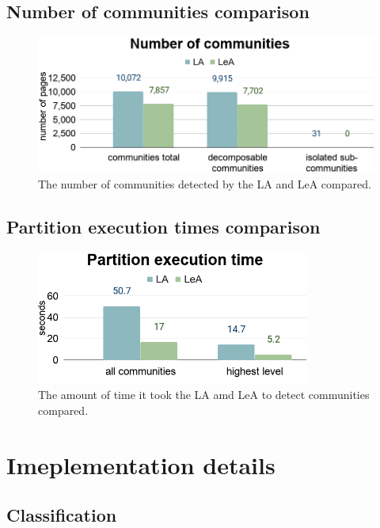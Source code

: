 \section{Number of communities comparison} \label{dixNumberOfCommunitiesComparison}
\begin{figure}[ht!]
  \centering
  \includegraphics[width=\textwidth]{Images/CommunitiesComparison.png}
  \caption{The number of communities detected by the LA and LeA compared. }
  \label{CommunitiesComparison}
\end{figure}

\section{Partition execution times comparison} \label{dixExecutionTimesComparison}
\begin{figure}[ht!]
  \centering
  \includegraphics[width=0.8\textwidth]{Images/PartitionTimeComparison.png}
  \caption{The amount of time it took the LA amd LeA to detect communities compared.}
  \label{PartitionTimeComparison}
\end{figure}







\chapter{Imeplementation details}
\section{Classification}

